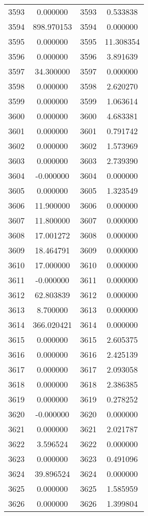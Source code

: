 \documentclass[12pt]{article}
\begin{document}
\begin{longtable}{@{}cccc@{}}
3593 & 0.000000 & 3593 & 0.533838 \\
3594 & 898.970153 & 3594 & 0.000000 \\
3595 & 0.000000 & 3595 & 11.308354 \\
3596 & 0.000000 & 3596 & 3.891639 \\
3597 & 34.300000 & 3597 & 0.000000 \\
3598 & 0.000000 & 3598 & 2.620270 \\
3599 & 0.000000 & 3599 & 1.063614 \\
3600 & 0.000000 & 3600 & 4.683381 \\
3601 & 0.000000 & 3601 & 0.791742 \\
3602 & 0.000000 & 3602 & 1.573969 \\
3603 & 0.000000 & 3603 & 2.739390 \\
3604 & -0.000000 & 3604 & 0.000000 \\
3605 & 0.000000 & 3605 & 1.323549 \\
3606 & 11.900000 & 3606 & 0.000000 \\
3607 & 11.800000 & 3607 & 0.000000 \\
3608 & 17.001272 & 3608 & 0.000000 \\
3609 & 18.464791 & 3609 & 0.000000 \\
3610 & 17.000000 & 3610 & 0.000000 \\
3611 & -0.000000 & 3611 & 0.000000 \\
3612 & 62.803839 & 3612 & 0.000000 \\
3613 & 8.700000 & 3613 & 0.000000 \\
3614 & 366.020421 & 3614 & 0.000000 \\
3615 & 0.000000 & 3615 & 2.605375 \\
3616 & 0.000000 & 3616 & 2.425139 \\
3617 & 0.000000 & 3617 & 2.093058 \\
3618 & 0.000000 & 3618 & 2.386385 \\
3619 & 0.000000 & 3619 & 0.278252 \\
3620 & -0.000000 & 3620 & 0.000000 \\
3621 & 0.000000 & 3621 & 2.021787 \\
3622 & 3.596524 & 3622 & 0.000000 \\
3623 & 0.000000 & 3623 & 0.491096 \\
3624 & 39.896524 & 3624 & 0.000000 \\
3625 & 0.000000 & 3625 & 1.585959 \\
3626 & 0.000000 & 3626 & 1.399804 \\

\end{longtable}
\end{document}
